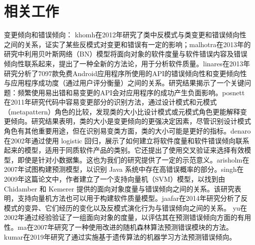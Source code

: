 \section{相关工作}
变更倾向和错误倾向：
khomh在2012年\cite{khomh2012exploratory}研究了类中反模式与类变更和错误倾向性之间的关系，证实了某些反模式对变更和错误有一定的影响；malhotra在2013年的研究\cite{malhotra2013investigation}中利用贝叶斯网络（BN）模型将面向对象的软件度量与软件错误内容及错误倾向性联系起来，提出了一种全新的方法论，用于分析软件质量。linares在2013年\cite{linares2013api}研究分析了7097款免费Android应用程序所使用的API的错误倾向性和变更倾向性与应用程序成功度（通过用户评分衡量）之间的关系。研究结果揭示了一个关键问题：频繁使用易出错和易变更的API会对应用程序的成功产生负面影响。posnett在2011年\cite{posnett2011empirical}研究代码中容易变更部分的识别方法，通过设计模式和元模式（metapattern）角色的比较，发现类的大小比设计模式或元模式角色更能解释变更倾向。研究结果表明，类的大小是变更倾向的更强决定因素，尽管识别设计模式角色有其他重要用途，但在识别易变类方面，类的大小可能是更好的指标。denaro在2002年\cite{denaro2002deriving}通过使用 logistic 回归，展示了如何建立将软件度量和软件错误倾向联系起来的模型，适用于同质软件产品的类别。它还提出了使用交叉验证来选择有效模型，即使是针对小数据集。这也为我们的研究提供了一定的示范意义。arisholm在2007年\cite{arisholm2007data}试图构建预测模型，以识别 Java 系统中存在高错误概率的部分。singh在2009年\cite{singh2009software}这篇论文中，作者建立了一个支持向量机（SVM）模型，以找到由 Chidamber 和 Kemerer 提供的面向对象度量与错误倾向之间的关系。该研究表明，支持向量机方法也可以用于构建软件质量模型。jaafar在2014年\cite{jaafar2014anti}研究分析了反模式的变异、它们经历的变化以及反模式演化行为与错误倾向之间的关系。
yu在2002年\cite{yu2002predicting}通过经验验证了一组面向对象的度量，以评估其在预测错误倾向方面的有用性。ma在2007年\cite{ma2007statistical}研究了一种使用改进的随机森林算法预测错误模块的方法。kumar在2019年\cite{kumar2019software}研究了通过实施基于遗传算法的机器学习方法预测错误倾向。

